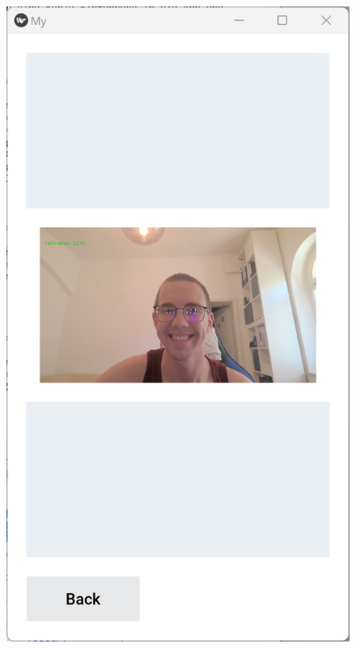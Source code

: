 \begin{figure}[h]
\begin{minipage}[b]{0.22\textwidth}
		\caption{}
		\label{fig:mainscreen}
	\end{minipage}
	\hfill
	\begin{minipage}[b]{0.22\textwidth}
		\includegraphics[width=\linewidth]{images/detectionscreen.png}
		\caption{}
		\label{fig:detectionscreen}
	\end{minipage}
	\hfill
	\begin{minipage}[b]{0.22\textwidth}

\end{minipage}
\end{figure}
